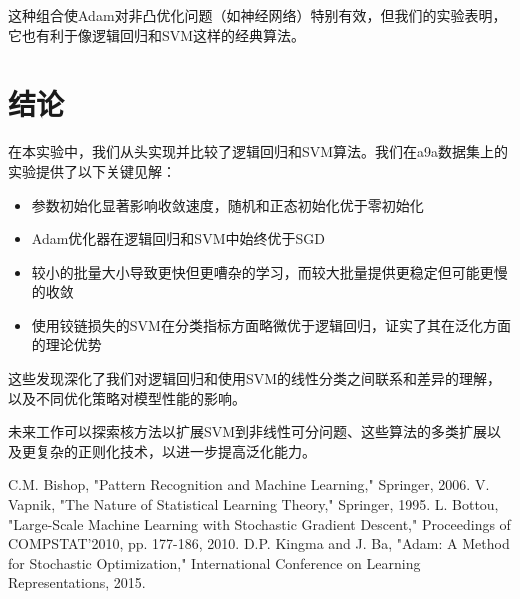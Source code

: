 \documentclass[journal, a4paper]{IEEEtran}
\begin{document}
\begin{CJK}{UTF8}{gbsn}
这种组合使Adam对非凸优化问题（如神经网络）特别有效，但我们的实验表明，它也有利于像逻辑回归和SVM这样的经典算法。

\section{结论}
在本实验中，我们从头实现并比较了逻辑回归和SVM算法。我们在a9a数据集上的实验提供了以下关键见解：

\begin{itemize}
    \item 参数初始化显著影响收敛速度，随机和正态初始化优于零初始化
    \item Adam优化器在逻辑回归和SVM中始终优于SGD
    \item 较小的批量大小导致更快但更嘈杂的学习，而较大批量提供更稳定但可能更慢的收敛
    \item 使用铰链损失的SVM在分类指标方面略微优于逻辑回归，证实了其在泛化方面的理论优势
\end{itemize}

这些发现深化了我们对逻辑回归和使用SVM的线性分类之间联系和差异的理解，以及不同优化策略对模型性能的影响。

未来工作可以探索核方法以扩展SVM到非线性可分问题、这些算法的多类扩展以及更复杂的正则化技术，以进一步提高泛化能力。

\begin{thebibliography}{00}
 C.M. Bishop, "Pattern Recognition and Machine Learning," Springer, 2006.
 V. Vapnik, "The Nature of Statistical Learning Theory," Springer, 1995.
 L. Bottou, "Large-Scale Machine Learning with Stochastic Gradient Descent," Proceedings of COMPSTAT'2010, pp. 177-186, 2010.
 D.P. Kingma and J. Ba, "Adam: A Method for Stochastic Optimization," International Conference on Learning Representations, 2015.
\end{thebibliography}

\end{CJK}
\end{document}

